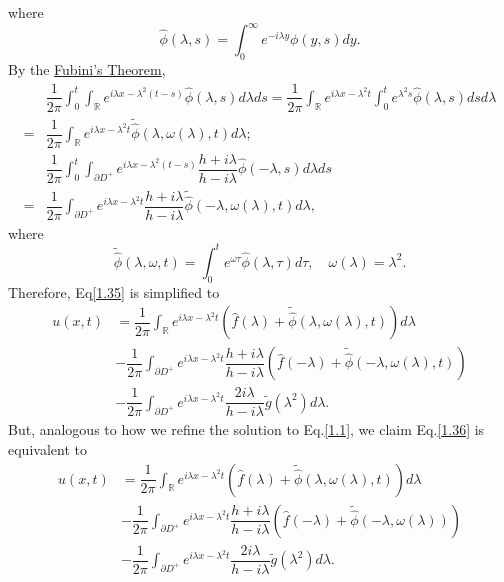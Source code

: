 \documentclass[12pt]{article}
\numberwithin{equation}{section}
\begin{document}
where 
\begin{equation*}
    \hat{\phi}(\lambda,s)=\int_{0}^{\infty} e^{-i\lambda y}\phi(y,s)dy.
\end{equation*}
By the \href{https://w.wiki/9bX9}{Fubini's Theorem}, 
\begin{equation*}
    \begin{split}
        &\dfrac{1}{2\pi} \int_{0}^{t}\int_{\mathbb{R}} e^{i\lambda x-\lambda^2(t-s)}\hat{\phi}(\lambda,s)d\lambda ds=\dfrac{1}{2\pi}\int_{\mathbb{R}} e^{i\lambda x-\lambda^2 t}\int_{0}^{t} e^{\lambda^2 s}\hat{\phi}(\lambda,s)ds d\lambda\\
        =&\dfrac{1}{2\pi} \int_{\mathbb{R}} e^{i\lambda x-\lambda^2 t} \tilde{\hat{\phi}}(\lambda,\omega(\lambda),t)d\lambda;\\
        &\dfrac{1}{2\pi} \int_{0}^{t}\int_{\partial D^+} e^{i\lambda x-\lambda^2(t-s)}\dfrac{h+i\lambda}{h-i\lambda}\hat{\phi}(-\lambda,s)d\lambda ds\\
        =&\dfrac{1}{2\pi}\int_{\partial D^+}e^{i\lambda x-\lambda^2 t}\dfrac{h+i\lambda}{h-i\lambda}\tilde{\hat{\phi}}(-\lambda,\omega(\lambda),t)d\lambda,
    \end{split}
\end{equation*}
where 
\begin{equation*}
    \tilde{\hat{\phi}}(\lambda,\omega,t)=\int_{0}^{t} e^{\omega\tau}\hat{\phi}(\lambda,\tau)d\tau,\quad \omega(\lambda)=\lambda^2.
\end{equation*}
Therefore, Eq\eqref{1.35} is simplified to 
\begin{equation}\label{1.36}
    \begin{split}
        u(x,t)&=\dfrac{1}{2\pi}\int_{\mathbb{R}}e^{i\lambda x-\lambda^2 t}\left(\hat{f}(\lambda)+\tilde{\hat{\phi}}(\lambda,\omega(\lambda),t)\right)d\lambda\\
        &-\dfrac{1}{2\pi}\int_{\partial D^+}e^{i\lambda x-\lambda^2 t}\dfrac{h+i\lambda}{h-i\lambda}\left( \hat{f}(-\lambda)+\tilde{\hat{\phi}}(-\lambda,\omega(\lambda),t) \right)\\
        &-\dfrac{1}{2\pi} \int_{\partial D^+} e^{i\lambda x-\lambda^2 t}\dfrac{2i\lambda}{h-i\lambda}\tilde{g}(\lambda^2)d\lambda.
    \end{split}
\end{equation}
But, analogous to how we refine the solution to Eq.\eqref{1.1}, we claim Eq.\eqref{1.36} is equivalent to
\begin{equation}\label{1.37}
    \begin{split}
        u(x,t)&=\dfrac{1}{2\pi}\int_{\mathbb{R}}e^{i\lambda x-\lambda^2 t}\left(\hat{f}(\lambda)+\tilde{\hat{\phi}}(\lambda,\omega(\lambda),t)\right)d\lambda\\
        &-\dfrac{1}{2\pi}\int_{\partial D^+}e^{i\lambda x-\lambda^2 t}\dfrac{h+i\lambda}{h-i\lambda}\left( \hat{f}(-\lambda)+\tilde{\hat{\phi}}(-\lambda,\omega(\lambda)) \right)\\
        &-\dfrac{1}{2\pi} \int_{\partial D^+} e^{i\lambda x-\lambda^2 t}\dfrac{2i\lambda}{h-i\lambda}\tilde{g}(\lambda^2)d\lambda.
    \end{split}
\end{equation}
\end{document}
